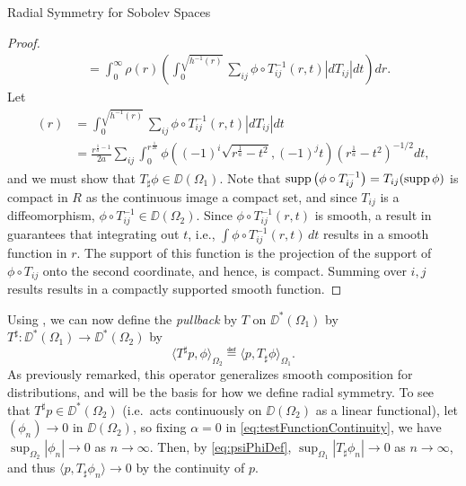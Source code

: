 \begin{chapter}{Radial Symmetry for Sobolev Spaces}
\begin{proof}
\begin{align}
    &= \int_0^\infty \rho(r) \left(\int_0^{\sqrt{h^{-1}(r)}} \sum_{ij}\phi \circ T_{ij}^{-1}(r,t)\left|dT_{ij}\right|dt \right)dr \label{eq:phiEquation}.
  \end{align}
  Let 
  \begin{align}
    [T_\sharp\phi](r) 
      &= \int_0^{\sqrt{h^{-1}(r)}} \sum_{ij}\phi \circ T_{ij}^{-1}(r,t)\left|dT_{ij}\right|dt \\
      &= \frac{r^{\frac 1a -1} }{2a}\sum_{ij}\int_0^{r^{\frac{1}{2a}}} \phi \left((-1)^i\sqrt{r^{\frac 1a} - t^2}, (-1)^jt\right) \left( r^{\frac 1a} - t^2 \right)^{-1/2} dt, \label{eq:psiPhiDef}
  \end{align}
  and we must show that $T_\sharp\phi \in \DD(\Omega_1)$.
  Note that $\operatorname*{supp} \left(\phi \circ T_{ij}^{-1} \right) = T_{ij}( \operatorname*{supp} \phi )$ is compact in $R$ as the continuous image a compact set, and since $T_{ij}$ is a diffeomorphism, $\phi \circ T_{ij}^{-1} \in \DD(\Omega_2)$. 
  Since $\phi\circ T_{ij}^{-1}(r,t)$ is smooth, a result in \cite[pg. 433]{strichartz2000} guarantees that integrating out $t$, i.e., $\int \phi \circ T_{ij}^{-1}(r,t)\,dt$ results in a smooth function in $r$.  
  The support of this function is the projection of the support of $\phi\circ T_{ij}$ onto the second coordinate, and hence, is compact.
  Summing over $i,j$ results results in a compactly supported smooth function.

\end{proof}

Using , we can now define the \emph{pullback} by $T$ on $\DD^*(\Omega_1)$ by $T^\sharp:\DD^*(\Omega_1) \to \DD^*(\Omega_2)$ by
\begin{equation}
  \langle T^\sharp p, \phi \rangle_{\Omega_2} \eqdef \langle p, T_\sharp\phi\rangle_{\Omega_1}.
\end{equation}
As previously remarked, this operator generalizes smooth composition for distributions, and will be the basis for how we define radial symmetry.
To see that $T^\sharp p \in \DD^*(\Omega_2)$ (i.e.~acts continuously on $\DD(\Omega_2)$ as a linear functional), let $(\phi_n) \to 0$ in $\DD(\Omega_2)$, so fixing $\alpha = 0$ in \eqref{eq:testFunctionContinuity}, we have $\sup_{\Omega_2}|\phi_n| \to 0$ as $n\to\infty$. 
Then, by \eqref{eq:psiPhiDef}, $\sup_{\Omega_1} |T_\sharp\phi_n| \to 0$ as $n\to\infty$, and thus $\langle p, T_\sharp\phi_n\rangle \to 0$ by the continuity of $p$. 


\end{chapter}
